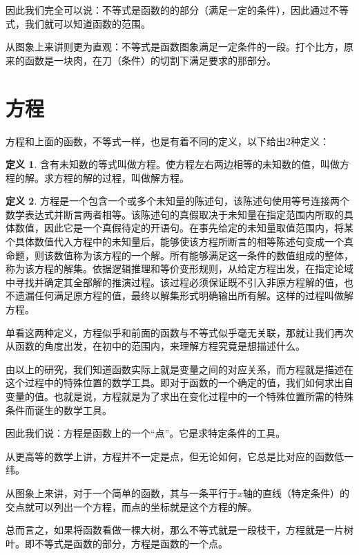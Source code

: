 \documentclass[a4paper,12pt]{ctexbook}
\theoremstyle{definition}
\newtheorem{definition}{定义}[chapter]
\theoremstyle{plain}
\theoremstyle{remark}
\begin{document}
因此我们完全可以说：不等式是函数的的部分（满足一定的条件），因此通过不等式，我们就可以知道函数的范围。

从图象上来讲则更为直观：不等式是函数图象满足一定条件的一段。打个比方，原来的函数是一块肉，在刀（条件）的切割下满足要求的那部分。

\section{方程}

方程和上面的函数，不等式一样，也是有着不同的定义，以下给出2种定义：

\begin{definition}
含有未知数的等式叫做方程。使方程左右两边相等的未知数的值，叫做方程的解。求方程的解的过程，叫做解方程。
\end{definition}

\begin{definition}
方程是一个包含一个或多个未知量的陈述句，该陈述句使用等号连接两个数学表达式并断言两者相等。该陈述句的真假取决于未知量在指定范围内所取的具体数值，因此它是一个真假待定的开语句。在事先给定的未知量取值范围内，将某个具体数值代入方程中的未知量后，能够使该方程所断言的相等陈述句变成一个真命题，则该数值称为该方程的一个解。所有能够满足这一条件的数值组成的整体，称为该方程的解集。依据逻辑推理和等价变形规则，从给定方程出发，在指定论域中寻找并确定其全部解的推演过程。该过程必须保证既不引入非原方程解的值，也不遗漏任何满足原方程的值，最终以解集形式明确输出所有解。这样的过程叫做解方程。
\end{definition}

单看这两种定义，方程似乎和前面的函数与不等式似乎毫无关联，那就让我们再次从函数的角度出发，在初中的范围内，来理解方程究竟是想描述什么。

由以上的研究，我们知道函数实际上就是变量之间的对应关系，而方程就是描述在这个过程中的特殊位置的数学工具。即对于函数的一个确定的值，我们如何求出自变量的值。也就是说，方程就是为了求出在变化过程中的一个特殊位置所需的特殊条件而诞生的数学工具。

因此我们说：方程是函数上的一个“点”。它是求特定条件的工具。

从更高等的数学上讲，方程并不一定是点，但无论如何，它总是比对应的函数低一纬。

从图象上来讲，对于一个简单的函数，其与一条平行于$x$轴的直线（特定条件）的交点就可以列出一个方程，而点的坐标就是这个方程的解。

总而言之，如果将函数看做一棵大树，那么不等式就是一段枝干，方程就是一片树叶。即不等式是函数的部分，方程是函数的一个点。
\end{document}
